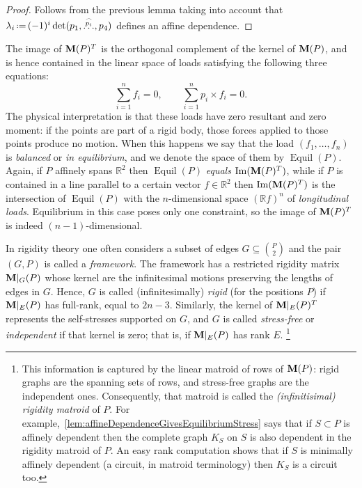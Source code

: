 \documentclass{amsart}
\theoremstyle{definition}
\newcommand{\R}{\mathbb{R}} %
\renewcommand{\b}[1]{{\boldsymbol{#1}}} %
\newcommand{\eqdef}{\mbox{\,\raisebox{0.2ex}{\scriptsize\ensuremath{\mathrm:}}\ensuremath{=}\,}} %
\DeclareMathOperator{\Ima}{Im} %
\newcommand{\darkblue}{\color{darkblue}} %
\newcommand{\defn}[1]{\textsl{\darkblue #1}} %
\newcommand{\Mmatrix}{\b{\rm M}} %
\newcommand{\Equil}{\operatorname{Equil} } %
\begin{document}
\begin{proof}
Follows from the previous lemma taking into account that $\lambda_i\eqdef (-1)^i \det(p_1,\stackrel{\overset{\frown}{p_i}}{\dots}, p_4)$ defines an affine dependence.
\end{proof}


The image of $\Mmatrix(P)^T$ is the orthogonal complement of the kernel of $\Mmatrix(P)$, and is hence contained in the linear space of loads satisfying the following three equations:
\[
\sum_{i=1}^n f_i =0, \qquad \sum_{i=1}^n p_i \times f_i =0.
\]
The physical interpretation is that these loads have 
zero resultant and zero moment: if the points are part of a rigid body, those forces applied to those points produce no motion.
When this happens we say that the load $(f_1,\dots,f_n)$ is \defn{balanced} or \defn{in equilibrium}, and we denote the space of them by $\Equil(P)$. 
Again, if $P$ affinely spans $\R^2$ then $\Equil(P)$ \emph{equals} $\Ima(\Mmatrix(P)^T)$, while if $P$ is contained in a line parallel to a certain vector $f\in \R^2$ then $\Ima(\Mmatrix(P)^T)$ is the intersection of $\Equil(P)$ with the $n$-dimensional space $(\R f)^{n}$ of \defn{longitudinal loads}. Equilibrium in this case poses only one constraint, so the image of $\Mmatrix(P)^T$ is indeed $(n-1)$-dimensional.

In rigidity theory one often considers a subset of edges $G \subseteq \binom{P}{2}$ and the pair $(G, P)$ is called a \defn{framework}. The framework has a restricted rigidity matrix $\Mmatrix|_G(P)$ whose kernel are the infinitesimal motions preserving the lengths of edges in $G$. Hence, $G$ is called (infinitesimally) \defn{rigid} (for the positions $P$) if $\Mmatrix|_E(P)$ has full-rank, equal to $2n-3$. Similarly, the kernel of $\Mmatrix|_E(P)^T$ represents the self-stresses supported on $G$, and $G$ is called \defn{stress-free} or \defn{independent} if that kernel is zero; that is, if $\Mmatrix|_E(P)$ has rank $E$.%
\footnote{\label{foot:matroid}This information is captured by the linear matroid of rows of $\Mmatrix(P)$: rigid graphs are the spanning sets of rows, and stress-free graphs are the independent ones. Consequently, that matroid is called the \defn{(infinitisimal) rigidity matroid} of $P$.
For example,~\cref{lem:affineDependenceGivesEquilibriumStress} says that if $S\subset P$ is affinely dependent then the complete graph $K_S$ on $S$ is also dependent in the rigidity matroid of $P$. An easy rank computation shows that if $S$ is minimally affinely dependent (a circuit, in matroid terminology) then $K_S$ is a circuit too.}%
\end{document}
